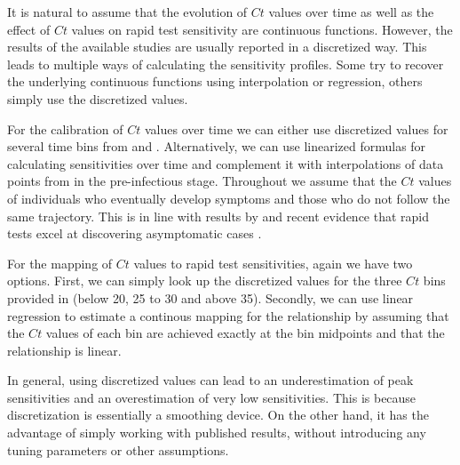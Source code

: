 {    %
    It is natural to assume that the evolution of $Ct$ values over time as well as the
    effect of $Ct$ values on rapid test sensitivity are continuous functions. However,
    the results of the available studies are usually reported in a discretized way. This
    leads to multiple ways of calculating the sensitivity profiles. Some try to recover
    the underlying continuous functions using interpolation or regression, others simply
    use the discretized values.

    For the calibration of $Ct$ values over time we can either use discretized values
    for several time bins from \cite{Ong2021} and \cite{Jang2021}. Alternatively, we can
    use linearized formulas for calculating sensitivities over time \cite{Cosentino2022}
    and complement it with interpolations of data points from \cite{Jang2021} in the
    pre-infectious stage. Throughout we assume that the $Ct$ values of individuals who
    eventually develop symptoms and those who do not follow the same trajectory. This is
    in line with results by \cite{Zuin2021} and recent evidence that rapid tests excel
    at discovering asymptomatic cases \cite{Rosella2022}.

    For the mapping of $Ct$ values to rapid test sensitivities, again we have two
    options. First, we can simply look up the discretized values for the three $Ct$ bins
    provided in \cite{Scheiblauer2021} (below 20, 25 to 30 and above 35). Secondly, we
    can use linear regression to estimate a continous mapping for the relationship by
    assuming that the $Ct$ values of each bin are achieved exactly at the bin midpoints
    and that the relationship is linear.

    In general, using discretized values can lead to an underestimation of peak
    sensitivities and an overestimation of very low sensitivities. This is because
    discretization is essentially a smoothing device. On the other hand, it has the
    advantage of simply working with published results, without introducing any tuning
    parameters or other assumptions.

}
